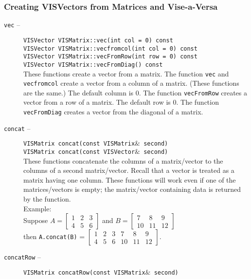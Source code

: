\subsubsection{Creating VISVectors from Matrices and Vise-a-Versa}
\label{ml_cvfmavav}
\begin{description}
\item[{\tt vec} --]
{\tt VISVector VISMatrix::vec(int col = 0) const}\\
{\tt VISVector VISMatrix::vecfromcol(int col = 0) const}\\
{\tt VISVector VISMatrix::vecFromRow(int row = 0) const}\\
{\tt VISVector VISMatrix::vecFromDiag() const}\\
These functions create a vector from a matrix.
The function {\tt vec} and {\tt vecfromcol} create a vector
from a column of a matrix.  (These functions are the same.)
The default column is 0.  The function {\tt vecFromRow} creates
a vector from a row of a matrix.  The default row is 0.
The function {\tt vecFromDiag} creates a vector from the diagonal
of a matrix.
\item[{\tt concat} --]
{\tt VISMatrix concat(const VISMatrix$\&$ second)}\\
{\tt VISMatrix concat(const VISVector$\&$ second)}\\
These functions concatenate the columns of a matrix/vector
to the columns of a second matrix/vector.
Recall that a vector is treated as a matrix having one column.
These functions will work
even if one of the matrices/vectors is empty; the matrix/vector
containing data is returned by the function.\\
Example:\\
Suppose
$A = \left[ \begin{array}{ccc} 1 & 2 & 3\\4 &5 & 6\end{array} \right]$
and
$B = \left[ \begin{array}{ccc} 7 & 8 & 9\\10 &11 & 12\end{array} \right]$\\
\vspace*{0.25in}
then {\tt A.concat(B)} = $\left[ \begin{array}{cccccc}
1 & 2 & 3 & 7 & 8 & 9\\
4 & 5 & 6 & 10 & 11 & 12 \end{array} \right]$.
\item[{\tt concatRow} --]
{\tt VISMatrix concatRow(const VISMatrix$\&$ second)}\\

\end{description}
